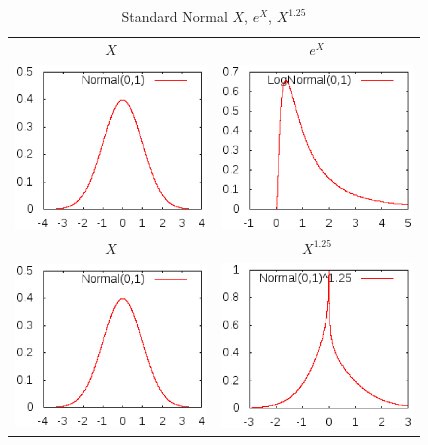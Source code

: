 \begin{table}
\begin{center}
\begin{tabular}{cc}
$X$ & $e^X$\\
\includegraphics[width=2in]{Images/NormalDSN.eps} &
\includegraphics[width=2in]{Images/LogNormalDSN.eps} \\
$X$ & $X^{1.25}$\\
\includegraphics[width=2in]{Images/NormalDSN.eps} &
\includegraphics[width=2in]{Images/PowerNormalDSN.eps} \\
\end{tabular}
\end{center}
\caption[Standard Normal $X$, $e^X$, $X^{1.25}$]
        {Standard Normal $X$, $e^X$, $X^{1.25}$}
\label{fig:OneDimFunction}
\end{table}

